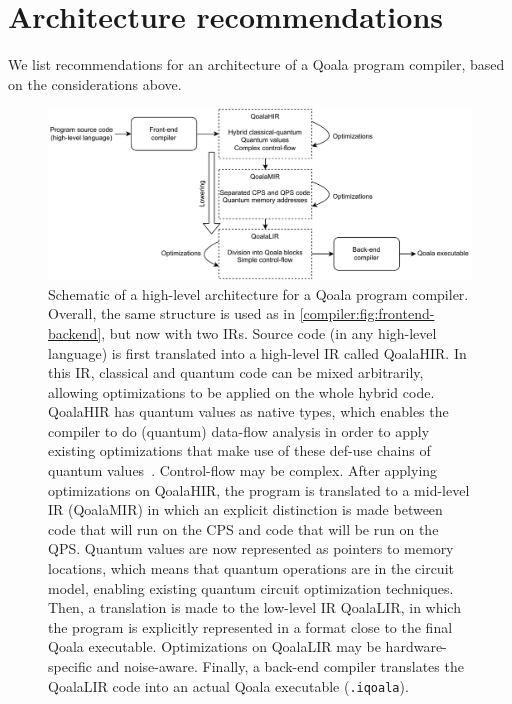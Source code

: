 \section{Architecture recommendations}
We list recommendations for an architecture of a Qoala program compiler, based on the considerations above.

\begin{figure}[t]
    \centering
    \includegraphics[width=\columnwidth]{figures/compiler/overall-design.pdf}
    \caption{Schematic of a high-level architecture for a Qoala program compiler.
    Overall, the same structure is used as in \cref{compiler:fig:frontend-backend}, but now with two \ac{IR}s.
    Source code (in any high-level language) is first translated into a high-level \ac{IR} called QoalaHIR. In this \ac{IR}, classical and quantum code can be mixed arbitrarily, allowing optimizations to be applied on the whole hybrid code.
    QoalaHIR has quantum values as native types, which enables the compiler to do (quantum) data-flow analysis in order to apply existing optimizations that make use of these def-use chains of quantum values~\cite{peduri_qssa_2022}. Control-flow may be complex.
    After applying optimizations on QoalaHIR, the program is translated to a mid-level \ac{IR} (QoalaMIR) in which an explicit distinction is made between code that will run on the CPS and code that will be run on the QPS.
    Quantum values are now represented as pointers to memory locations, which means that quantum operations are in the circuit model, enabling existing quantum circuit optimization techniques.
    Then, a translation is made to the low-level IR QoalaLIR, in which the program is explicitly represented in a format close to the final Qoala executable.
    Optimizations on QoalaLIR may be hardware-specific and noise-aware.
    Finally, a back-end compiler translates the QoalaLIR code into an actual Qoala executable (\texttt{.iqoala}).
    }
    \label{compiler:fig:overall-design}
\end{figure}

